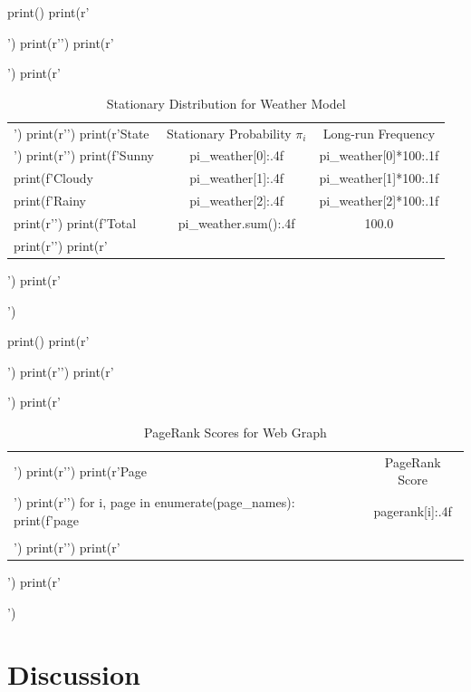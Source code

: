 \documentclass[11pt,a4paper]{article}
\begin{document}
\begin{pycode}
print()
print(r'\begin{table}[H]')
print(r'\centering')
print(r'\caption{Stationary Distribution for Weather Model}')
print(r'\begin{tabular}{@{}lcc@{}}')
print(r'\toprule')
print(r'State & Stationary Probability $\pi_i$ & Long-run Frequency \\')
print(r'\midrule')
print(f'Sunny & {pi_weather[0]:.4f} & {pi_weather[0]*100:.1f}\\%
print(f'Cloudy & {pi_weather[1]:.4f} & {pi_weather[1]*100:.1f}\\%
print(f'Rainy & {pi_weather[2]:.4f} & {pi_weather[2]*100:.1f}\\%
print(r'\midrule')
print(f'Total & {pi_weather.sum():.4f} & 100.0\\%
print(r'\bottomrule')
print(r'\end{tabular}')
print(r'\end{table}')

print()
print(r'\begin{table}[H]')
print(r'\centering')
print(r'\caption{PageRank Scores for Web Graph}')
print(r'\begin{tabular}{@{}lc@{}}')
print(r'\toprule')
print(r'Page & PageRank Score \\')
print(r'\midrule')
for i, page in enumerate(page_names):
    print(f'{page} & {pagerank[i]:.4f} \\\\')
print(r'\bottomrule')
print(r'\end{tabular}')
print(r'\end{table}')
\end{pycode}

\section{Discussion}
\end{document}
